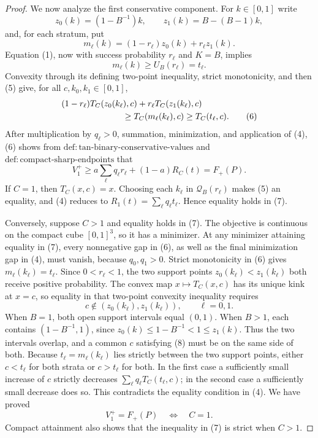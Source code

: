\documentclass{article}
\begin{document}
\begin{proof}
We now analyze the first conservative component.  For \(k\in[0,1]\)
write
\[
 z_0(k)=(1-B^{-1})k,\qquad z_1(k)=B-(B-1)k,
\]
and, for each stratum, put
\[
 m_\ell(k)=(1-r_\ell)z_0(k)+r_\ell z_1(k).
\]
Equation (1), now with success probability \(r_\ell\) and
\(K=B\), implies
\[
 m_\ell(k)\geq U_B(r_\ell)=t_\ell.                 \tag{5}
\]
Convexity through its defining two-point inequality, strict
monotonicity, and then (5) give, for all \(c,k_0,k_1\in[0,1]\),
\[
 \begin{aligned}
 &(1-r_\ell)T_C(z_0(k_\ell),c)
      +r_\ell T_C(z_1(k_\ell),c)\\
 &\hspace{25mm}\geq T_C(m_\ell(k_\ell),c)
 \geq T_C(t_\ell,c).                               \tag{6}
 \end{aligned}
\]
After multiplication by \(q_\ell>0\), summation, minimization, and
application of (4), (6) shows from
\(\mathrm{def{:}tan\text{-}binary\text{-}conservative\text{-}values}\)
and \(\mathrm{def{:}compact\text{-}sharp\text{-}endpoints}\) that
\[
 V_1^+\geq a\sum_\ell q_\ell r_\ell+(1-a)R_C(t)=F_+(P).       \tag{7}
\]
If \(C=1\), then \(T_C(x,c)=x\).  Choosing each \(k_\ell\) in
\(\mathcal Q_B(r_\ell)\) makes (5) an equality, and (4) reduces to
\(R_1(t)=\sum_\ell q_\ell t_\ell\).  Hence equality holds in (7).

Conversely, suppose \(C>1\) and equality holds in (7).  The objective
is continuous on the compact cube \([0,1]^3\), so it has a minimizer.
At any minimizer attaining equality in (7), every nonnegative gap in
(6), as well as the final minimization gap in (4), must vanish, because
\(q_0,q_1>0\).  Strict monotonicity in (6) gives
\(m_\ell(k_\ell)=t_\ell\).  Since \(0<r_\ell<1\), the two support
points \(z_0(k_\ell)<z_1(k_\ell)\) both receive positive probability.
The convex map \(x\mapsto T_C(x,c)\) has its unique kink at \(x=c\),
so equality in that two-point convexity inequality requires
\[
 c\notin(z_0(k_\ell),z_1(k_\ell)),\qquad \ell=0,1.             \tag{8}
\]
When \(B=1\), both open support intervals equal \((0,1)\).  When
\(B>1\), each contains \((1-B^{-1},1)\), since
\(z_0(k)\leq1-B^{-1}<1\leq z_1(k)\).  Thus the two intervals overlap,
and a common \(c\) satisfying (8) must be on the same side of both.
Because \(t_\ell=m_\ell(k_\ell)\) lies strictly between the two support
points, either \(c<t_\ell\) for both strata or \(c>t_\ell\) for both.
In the first case a sufficiently small increase of \(c\) strictly
decreases \(\sum_\ell q_\ell T_C(t_\ell,c)\); in the second case a
sufficiently small decrease does so.  This contradicts the equality
condition in (4).  We have proved
\[
 V_1^+=F_+(P)\quad\Longleftrightarrow\quad C=1.                 \tag{9}
\]
Compact attainment also shows that the inequality in (7) is strict
when \(C>1\).


\end{proof}
\end{document}
